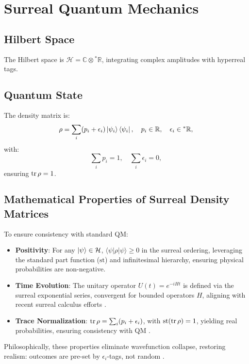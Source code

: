 \documentclass{article}
\begin{document}
\section{Surreal Quantum Mechanics}
\subsection{Hilbert Space}
The Hilbert space is \(\mathcal{H} = \mathbb{C} \otimes {}^*\mathbb{R}\), integrating complex amplitudes with hyperreal tags.

\subsection{Quantum State}
The density matrix is:
\begin{equation}
\rho = \sum_i (p_i + \epsilon_i) \ket{\psi_i}\bra{\psi_i}, \quad p_i \in \mathbb{R}, \quad \epsilon_i \in {}^*\mathbb{R},
\end{equation}
with:
\begin{equation}
\sum_i p_i = 1, \quad \sum_i \epsilon_i = 0,
\end{equation}
ensuring \(\tr \rho = 1\).

\subsection{Mathematical Properties of Surreal Density Matrices}
To ensure consistency with standard QM:
\begin{itemize}
    \item \textbf{Positivity}: For any \(\ket{\psi} \in \mathcal{H}\), \(\langle \psi | \rho | \psi \rangle \geq 0\) in the surreal ordering, leveraging the standard part function (\(\text{st}\)) and infinitesimal hierarchy, ensuring physical probabilities are non-negative.
    \item \textbf{Time Evolution}: The unitary operator \(U(t) = e^{-i H t}\) is defined via the surreal exponential series, convergent for bounded operators \(H\), aligning with recent surreal calculus efforts \cite{Ehrlich2012}.
    \item \textbf{Trace Normalization}: \(\tr \rho = \sum_i (p_i + \epsilon_i)\), with \(\text{st}(\tr \rho) = 1\), yielding real probabilities, ensuring consistency with QM \cite{Goldblatt1998}.
\end{itemize}

Philosophically, these properties eliminate wavefunction collapse, restoring realism: outcomes are pre-set by \(\epsilon_i\)-tags, not random \cite{tHooft2014}.
\end{document}
